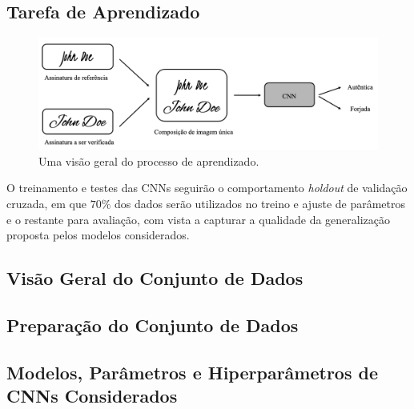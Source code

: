 
\subsection{Tarefa de Aprendizado}

\begin{figure}[h!]
\centering
\caption{Uma visão geral do processo de aprendizado.}
\label{fig:esquema-solucao}
\includegraphics[width=\textwidth]{imgs/esquema-solucao}
\end{figure}

O treinamento e testes das CNNs seguirão o comportamento \emph{holdout} de validação
cruzada, em que $70\%$ dos dados serão utilizados no treino e ajuste de parâmetros e o
restante para avaliação, com vista a capturar a qualidade da generalização proposta pelos
modelos considerados.

\subsection{Visão Geral do Conjunto de Dados}


\subsection{Preparação do Conjunto de Dados}


\subsection{Modelos, Parâmetros e Hiperparâmetros de CNNs Considerados}
